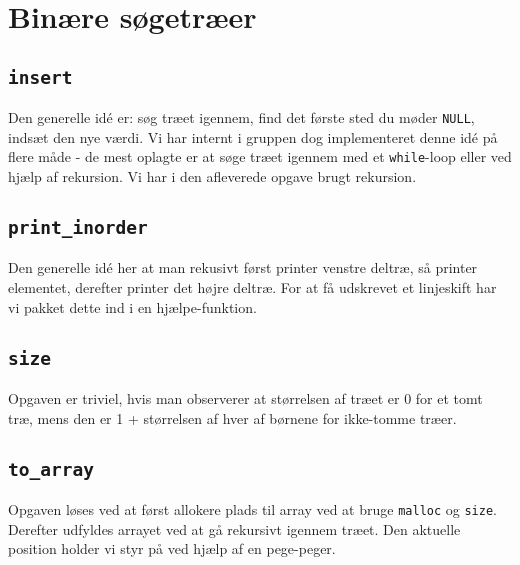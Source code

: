\section{Binære søgetræer}

\subsection{\tt insert}

Den generelle idé er: søg træet igennem, find det første sted du møder
{\tt NULL}, indsæt den nye værdi. Vi har internt i gruppen dog implementeret
denne idé på flere måde - de mest oplagte er at søge træet igennem med et
{\tt while}-loop eller ved hjælp af rekursion. Vi har i den afleverede opgave
brugt rekursion.

\subsection{\tt print\_inorder}

Den generelle idé her at man rekusivt først printer venstre deltræ, så
printer elementet, derefter printer det højre deltræ. For at få udskrevet et
linjeskift har vi pakket dette ind i en hjælpe-funktion.

\subsection{\tt size}

Opgaven er triviel, hvis man observerer at størrelsen af træet er 0 for et
tomt træ, mens den er 1 + størrelsen af hver af børnene for ikke-tomme
træer.

\subsection{\tt to\_array}

Opgaven løses ved at først allokere plads til array ved at bruge {\tt malloc} og
{\tt size}. Derefter udfyldes arrayet ved at gå rekursivt igennem træet. Den
aktuelle position holder vi styr på ved hjælp af en pege-peger.
